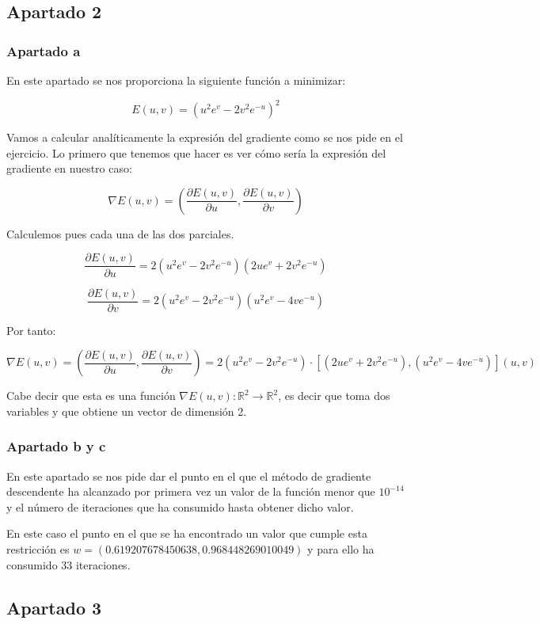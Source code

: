 \documentclass[12pt,a4paper]{article}
\begin{document}
\subsection{Apartado 2}

\subsubsection{Apartado a}

En este apartado se nos proporciona la siguiente función a minimizar:

$$E(u,v) = (u^2 e^{v} - 2v^2 e^{-u})^2$$

Vamos a calcular analíticamente la expresión del gradiente como se nos pide en el ejercicio. Lo primero que tenemos que hacer es ver cómo sería la expresión del gradiente en nuestro caso:

$$\nabla E(u,v) = (\frac{\partial E(u,v)}{\partial u},\frac{\partial E(u,v)}{\partial v})$$

Calculemos pues cada una de las dos parciales.

$$\frac{\partial E(u,v)}{\partial u} = 2(u^2 e^{v} - 2v^2 e^{-u})(2ue^{v}+2v^2e^{-u})$$

$$\frac{\partial E(u,v)}{\partial v} = 2(u^2 e^{v} - 2v^2 e^{-u})(u^2 e^{v}-4ve^{-u})$$

Por tanto:

$$\nabla E(u,v) = (\frac{\partial E(u,v)}{\partial u},\frac{\partial E(u,v)}{\partial v}) = 2 (u^2 e^{v} - 2v^2 e^{-u})\cdot [(2ue^{v}+2v^2e^{-u}), (u^2 e^{v}-4ve^{-u})](u,v)$$

Cabe decir que esta es una función $\nabla E(u,v): \mathbb{R}^2 \rightarrow \mathbb{R}^2$, es decir que toma dos variables y que obtiene un vector de dimensión 2.

\subsubsection{Apartado b y c}

En este apartado se nos pide dar el punto en el que el método de gradiente descendente ha alcanzado por primera vez un valor de la función menor que $10^{-14}$ y el número de iteraciones que ha consumido hasta obtener dicho valor.

En este caso el punto en el que se ha encontrado un valor que cumple esta restricción es $w=(0.619207678450638,0.968448269010049)$ y para ello ha consumido $33$ iteraciones.

\subsection{Apartado 3}
\end{document}
